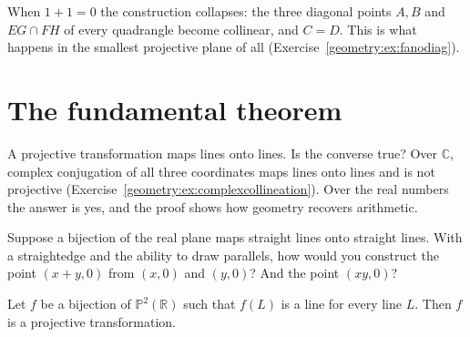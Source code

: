 When $1+1=0$ the construction collapses: the three diagonal points $A,B$ and $EG\cap FH$ of every quadrangle become collinear, and $C=D$. This is
what happens in the smallest projective plane of all (Exercise~\ref{geometry:ex:fanodiag}).

\section{The fundamental theorem}

A projective transformation maps lines onto lines. Is the converse true? Over $\mathbb C$, complex conjugation of all three coordinates maps lines
onto lines and is not projective (Exercise~\ref{geometry:ex:complexcollineation}). Over the real numbers the answer is yes, and the proof shows how
geometry recovers arithmetic.

\begin{think}
Suppose a bijection of the real plane maps straight lines onto straight lines. With a straightedge and the ability to draw parallels, how would
you construct the point $(x+y,0)$ from $(x,0)$ and $(y,0)$? And the point $(xy,0)$?
\end{think}

\begin{theorem}\label{geometry:thm:fundamental}
Let $f$ be a bijection of $\mathbb P^2(\mathbb R)$ such that $f(L)$ is a line for every line $L$. Then $f$ is a projective transformation.
\end{theorem}

